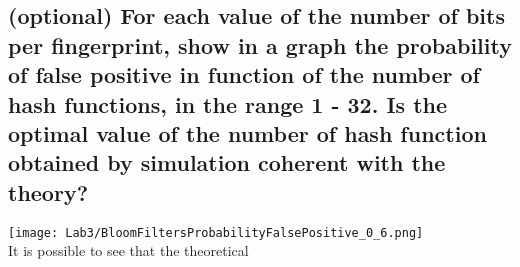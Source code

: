 \documentclass{report}
\begin{document}
{%


				\subsection{(optional) For each value of the number of bits per fingerprint, show in a graph the probability of false positive in function of the number of hash functions, in the range 1 - 32. Is the optimal value of the number of hash function obtained by simulation coherent with the theory?}
				\texttt{[image: Lab3/BloomFiltersProbabilityFalsePositive\_0\_6.png]} \\
				It is possible to see that the theoretical
				
}
\end{document}
